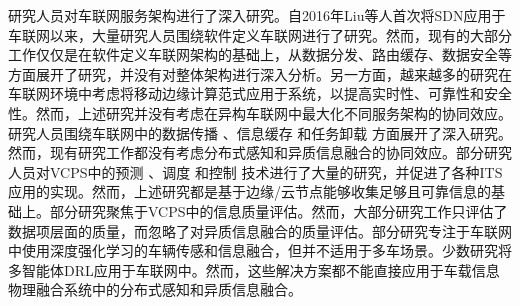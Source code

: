 研究人员对车联网服务架构进行了深入研究。自2016年Liu等人\cite{liu2016cooperative}首次将SDN应用于车联网以来，大量研究人员围绕软件定义车联网进行了研究\cite{dai2018cooperative, luo2018sdnmac, liu2018coding, zhang2022ac-sdvn, zhao2022elite, lin2023alps, ahmed2023deep}。然而，现有的大部分工作仅仅是在软件定义车联网架构的基础上，从数据分发、路由缓存、数据安全等方面展开了研究，并没有对整体架构进行深入分析。另一方面，越来越多的研究在车联网环境中考虑将移动边缘计算范式应用于系统，以提高实时性、可靠性和安全性\cite{liu2017a, lang2022cooperative, liu2021fog, dai2021edge, zhang2022digital, liu2020adaptive, liao2021learning, liu2023mobility, liu2023asynchronous}。然而，上述研究并没有考虑在异构车联网中最大化不同服务架构的协同效应。研究人员围绕车联网中的数据传播 \cite{liu2021fog, singh2020intent}、信息缓存 \cite{zhang2022digital, dai2020deep, su2018an} 和任务卸载 \cite{shang2021deep, liao2021learning} 方面展开了深入研究。然而，现有研究工作都没有考虑分布式感知和异质信息融合的协同效应。部分研究人员对VCPS中的预测 \cite{zhang2019a, zhang2020data}、调度 \cite{li2020cyber, lian2021cyber} 和控制 \cite{dai2016a, hu2017cyber, lv2018driving}技术进行了大量的研究，并促进了各种ITS应用的实现。然而，上述研究都是基于边缘/云节点能够收集足够且可靠信息的基础上。部分研究聚焦于VCPS中的信息质量评估\cite{liu2014temporal, dai2019temporal, liu2014scheduling, rager2017scalability, yoon2021performance}。然而，大部分研究工作只评估了数据项层面的质量，而忽略了对异质信息融合的质量评估。部分研究专注于车联网中使用深度强化学习的车辆传感和信息融合\cite{dong2020spatio, zhao2020social, mlika2022deep}，但并不适用于多车场景。少数研究将多智能体DRL应用于车联网中\cite{kumar2022multi, he2021efficient}。然而，这些解决方案都不能直接应用于车载信息物理融合系统中的分布式感知和异质信息融合。

